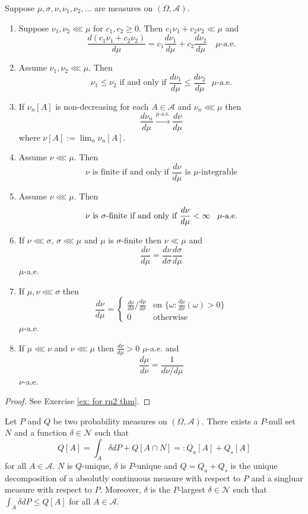 \begin{theorem}
\label{thm: props of rn}
Suppose $\mu, \sigma, \nu, \nu_1, \nu_2, \ldots$ are measures on $(\Omega, \mathcal A)$.


\begin{enumerate}
\item Suppose $\nu_1,\nu_2 \lll\mu$ for $c_1, c_2 \geq 0$. Then $c_1\nu_1 +c_2\nu_2 \ll \mu $ and
\[
\frac{d(c_1\nu_1 +c_2\nu_2 )}{d\mu} =  c_1\frac{d\nu_1 }{d\mu} +  c_2\frac{d\nu_2}{d\mu}\quad \text{$\mu$-a.e.}
\]
\item
Assume $\nu_1,\nu_2 \lll \mu$. Then
\[\text{$\nu_1 \leq \nu_2$ if and only if $\displaystyle\frac{d\nu_1}{d\mu} \leq \frac{d\nu_2}{d\mu}$ $\mu$-a.e.}\]
\item If $\nu_n[A]$ is non-decreasing for each $A\in \mathcal A$ and  $\nu_n \lll \mu$ then
\[ \frac{d\nu_n}{d\mu} \overset{\text{$\mu$-a.e.}}\longrightarrow\frac{d\nu}{d\mu} \]
where $\nu[A]:=\lim_n \nu_n[A]$.
\item
\label{item: finite rn}
 Assume $\nu \lll \mu$. Then
\[ \text{$\nu$ is finite if and only if $\frac{d\nu}{d\mu}$ is $\mu$-integrable}\]
\item Assume $\nu \lll \mu$. Then
\[\text{$\nu$ is $\sigma$-finite if and only if $\frac{d\nu}{d\mu}<\infty$ \, $\mu$-a.e.}\]
\item If  $\nu \lll \sigma$, $\sigma \lll \mu$  and $\mu$ is $\sigma$-finite then $\nu \ll \mu$ and
\[\frac{d\nu}{d\mu} =  \frac{d\nu}{d\sigma}\frac{d\sigma}{d\mu} \]
$\mu$-a.e.
\item If $\mu, \nu \lll \sigma$  then
\[
\frac{d\nu}{d\mu} =\begin{cases}
\frac{d\nu}{d\sigma} / \frac{d\mu}{d\sigma} & \text{on $\{\omega\colon\frac{d\mu}{d\sigma}(\omega) > 0 \}$} \\
0 & \text{otherwise}
\end{cases}
 \]
$\mu$-a.e.
\item If  $\mu\lll \nu$  and $\nu\lll \mu$ then $\frac{d\nu}{d\mu} > 0$ $\mu$-a.e. and
\[\frac{d\mu}{d\nu} = \frac{1}{d\nu/d\mu}  \]
$\nu$-a.e.
\end{enumerate}
\end{theorem}
\begin{proof} See Exercise \ref{ex: for rn2 thm}.
\end{proof}





\begin{theorem}
Let $P$ and $Q$ be two probability measures on $(\Omega, \mathcal A)$. There exists a $P$-null set $N$ and a function $\delta\in \mathscr N$  such that
\[
Q[A] = \int_A\delta dP +  Q[A\cap N] =: Q_a[A] + Q_s[A]
\]
for all $A\in \mathcal A$.
$N$ is $Q$-unique, $\delta$ is $P$-unique and $Q = Q_a + Q_s$ is the unique decomposition of a absolutly continuous measure with respect to $P$  and a singluar measure with respect to $P$. Moreover, $\delta$ is the $P$-largest $\delta\in \mathscr N$ such that $\int_A \delta dP \leq Q[A]$ for all $A\in \mathcal A$.
\end{theorem}



